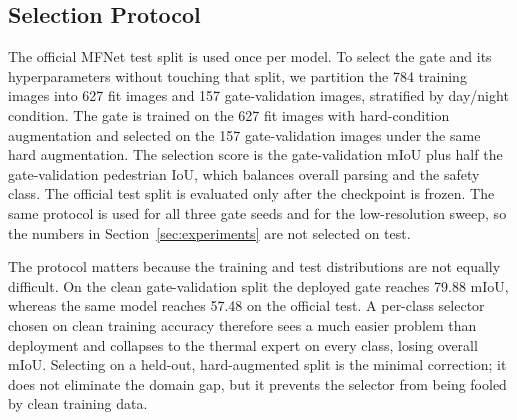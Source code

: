 \subsection{Selection Protocol}

The official MFNet test split is used once per model. To select the gate and its
hyperparameters without touching that split, we partition the 784 training images into
627 fit images and 157 gate-validation images, stratified by day/night condition. The gate is trained on the 627 fit images with hard-condition
augmentation and selected on the 157 gate-validation images under the same hard
augmentation. The selection score is the gate-validation mIoU plus half the
gate-validation pedestrian IoU, which balances overall parsing and the safety class.
The official test split is evaluated only after the checkpoint is frozen. The same
protocol is used for all three gate seeds and for the low-resolution sweep, so the
numbers in Section~\ref{sec:experiments} are not selected on test.

The protocol matters because the training and test distributions are not equally
difficult. On the clean gate-validation split the deployed gate reaches 79.88 mIoU,
whereas the same model reaches 57.48 on the official test. A per-class selector chosen
on clean training accuracy therefore sees a much easier problem than deployment and
collapses to the thermal expert on every class, losing overall mIoU. Selecting on a
held-out, hard-augmented split is the minimal correction; it does not eliminate the
domain gap, but it prevents the selector from being fooled by clean training data.

